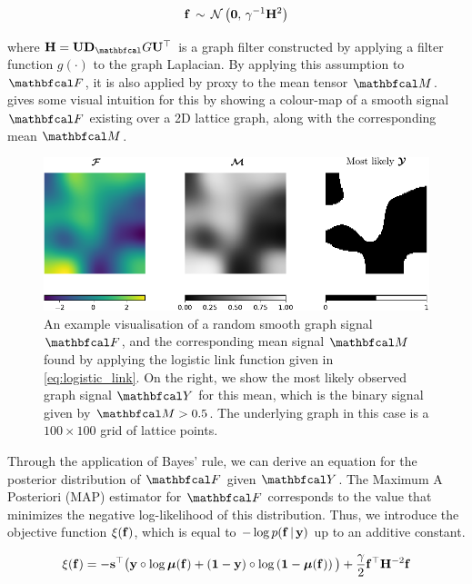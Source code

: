 \begin{equation}
    \mathbf{f}  \, \sim \, \mathcal{N}\left( \mathbf{0}, \, \gamma^{-1} \mathbf{H}^2 \right) 
\end{equation}

where $\HH = \U \D_\Gt \U^\top$ is a graph filter constructed by applying a filter function $g(\cdot)$ to the graph Laplacian. By applying this assumption to $\Ft$, it is also applied by proxy to the mean tensor $\Mt$.  gives some visual intuition for this by showing a colour-map of a smooth signal $\Ft$ existing over a 2D lattice graph, along with the corresponding mean $\Mt$. 

\begin{figure}[t] 
    \begin{center}
        \includegraphics[width=\linewidth]{Figures/logistic_gsr.pdf}
    \end{center}
   \caption[Visualisation of a smooth graph signal and corresponding Bernoulli mean]{An example visualisation of a random smooth graph signal $\Ft$, and the corresponding mean signal $\Mt$ found by applying the logistic link function given in \cref{eq:logistic_link}. On the right, we show the most likely observed graph signal $\Yt$ for this mean, which is the binary signal given by $\Mt > 0.5$. The underlying graph in this case is a $100 \times 100$ grid of lattice points. } 
    \label{fig:logistic_gsr}
\end{figure} 

Through the application of Bayes' rule, we can derive an equation for the posterior distribution of $\Ft$ given $\Yt$. The Maximum A Posteriori (MAP) estimator for $\Ft$ corresponds to the value that minimizes the negative log-likelihood of this distribution. Thus, we introduce the objective function $\xi(\mathbf{f}) $, which is equal to $ -\log p(\mathbf{f} \, | \, \mathbf{y})$ up to an additive constant.
 
\begin{equation*}
    \xi(\mathbf{f}) = -\mathbf{s}^\top \big(\mathbf{y} \circ \log \boldsymbol{\mu}(\mathbf{f}) + \left(\mathbf{1}  - \mathbf{y}\right) \circ \log \left(\mathbf{1} - \boldsymbol{\mu}(\mathbf{f}) \right)\big) + \frac{\gamma}{2} \mathbf{f}^\top \mathbf{H}^{-2} \mathbf{f}
\end{equation*}

